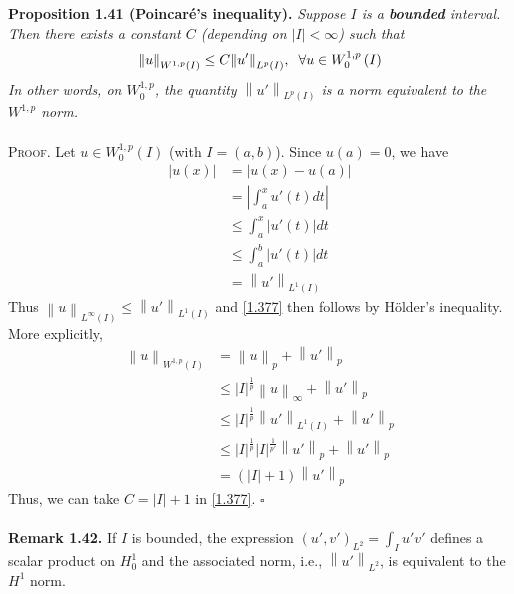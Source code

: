 \documentclass[a4paper,oneside]{book}
\numberwithin{equation}{chapter}
\begin{document}
\textbf{Proposition 1.41 (Poincar\'{e}'s inequality).} \textit{Suppose $I$ is a \textbf{bounded} interval. Then there exists a constant $C$ (depending on $\left| I \right| < \infty $) such that}
\begin{align}
\label{1.377}
{\left\| u \right\|_{{W^{1,p}}\left( I \right)}} \le C{\left\| {u'} \right\|_{{L^p}\left( I \right)}},\hspace{0.2cm}\forall u \in W_0^{1,p}\left( I \right) 
\end{align} 
\textit{In other words, on $W_0^{1,p}$, the quantity ${\left\| {u'} \right\|_{{L^p}\left( I \right)}}$ is a norm equivalent to the $W^{1,p}$ norm.}\\
\\
\textsc{Proof.} Let $u \in W_0^{1,p}\left( I \right)$ (with $I=\left(a,b\right)$). Since $u\left(a\right)=0$, we have
\begin{align}
\left| {u\left( x \right)} \right| &= \left| {u\left( x \right) - u\left( a \right)} \right|\\
& = \left| {\int_a^x {u'\left( t \right)dt} } \right|\\
& \le \int_a^x {\left| {u'\left( t \right)} \right|dt} \\
& \le \int_a^b {\left| {u'\left( t \right)} \right|dt} \\
& = {\left\| {u'} \right\|_{{L^1}\left(I\right)}}
\end{align}
Thus ${\left\| u \right\|_{{L^\infty }\left( I \right)}} \le {\left\| {u'} \right\|_{{L^1}\left( I \right)}}$ and \eqref{1.377} then follows by H\"{o}lder's inequality. More explicitly,
\begin{align}
{\left\| u \right\|_{{W^{1,p}}\left( I \right)}} &= {\left\| u \right\|_p} + {\left\| {u'} \right\|_p}\\
& \le {\left| I \right|^{\frac{1}{p}}}{\left\| u \right\|_\infty } + {\left\| {u'} \right\|_p}\\
& \le {\left| I \right|^{\frac{1}{p}}}{\left\| {u'} \right\|_{{L^1}\left( I \right)}} + {\left\| {u'} \right\|_p}\\
& \le {\left| I \right|^{\frac{1}{p}}}{\left| I \right|^{\frac{1}{{p'}}}}{\left\| {u'} \right\|_p} + {\left\| {u'} \right\|_p}\\
& = \left( {\left| I \right| + 1} \right){\left\| {u'} \right\|_p}
\end{align}
Thus, we can take ${C = \left| I \right| + 1}$ in \eqref{1.377}. \hfill $\square$\\
\\
\textbf{Remark 1.42.} If $I$ is bounded, the expression ${\left( {u',v'} \right)_{{L^2}}} = \int_I {u'v'} $ defines a scalar product on $H_0^1$ and the associated norm, i.e., ${\left\| {u'} \right\|_{{L^2}}}$, is equivalent to the $H^1$ norm.
\end{document}
